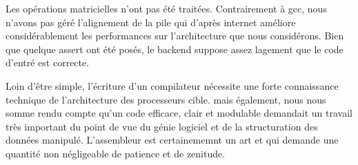 \documentclass[a4paper, 11pt]{article}
\begin{document}
Les opérations matricielles n'ont pas été traitées. Contrairement à gcc, nous n'avons pas géré l'alignement de la pile qui d'après internet
améliore considérablement les performances sur l'architecture que nous considérons. Bien que quelque assert ont été posés, le backend 
suppose assez lagement que le code d'entré est correcte.

Loin d'être simple, l'écriture d'un compilateur nécessite une forte connaissance technique de l'architecture des processeurs cible.  mais 
également, nous nous somme rendu compte qu'un code efficace, clair et modulable demandait un travail très important du point de vue du
génie logiciel et de la structuration des données manipulé.
L'assembleur est certainememnt un art et qui demande une quantité non négligeable de patience et de zenitude.
\end{document}
